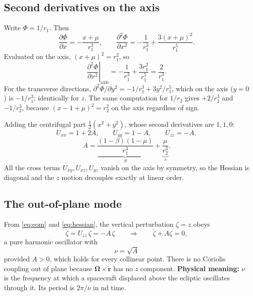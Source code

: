 \documentclass[11pt,a4paper]{article}
\begin{document}
\subsection{Second derivatives on the axis}

Write $\Phi=1/r_1$. Then
\begin{equation}
  \frac{\partial\Phi}{\partial x} = -\frac{x+\mu}{r_1^3},
  \qquad
  \frac{\partial^2\Phi}{\partial x^2}
  = -\frac{1}{r_1^3} + \frac{3(x+\mu)^2}{r_1^5} .
\end{equation}
Evaluated on the axis, $(x+\mu)^2=r_1^2$, so
\begin{equation}
  \left.\frac{\partial^2\Phi}{\partial x^2}\right|_{\mathrm{axis}}
  = -\frac{1}{r_1^3} + \frac{3r_1^2}{r_1^5} = \frac{2}{r_1^3} .
\end{equation}
For the transverse directions, $\partial^2\Phi/\partial y^2
= -1/r_1^3 + 3y^2/r_1^5$, which on the axis ($y=0$) is $-1/r_1^3$; identically
for $z$. The same computation for $1/r_2$ gives $+2/r_2^3$ and $-1/r_2^3$,
because $(x-1+\mu)^2=r_2^2$ on the axis regardless of sign.

Adding the centrifugal part $\tfrac12(x^2+y^2)$, whose second derivatives are
$1,1,0$:
\begin{equation}
  U_{xx} = 1 + 2A, \qquad U_{yy} = 1 - A, \qquad U_{zz} = -A,
  \label{eq:hessian}
\end{equation}
\begin{equation}
  A = \underbrace{\frac{(1-\beta)(1-\mu)}{r_1^3}}_{\textstyle S}
    + \underbrace{\frac{\mu}{r_2^3}}_{\textstyle s} .
  \label{eq:Asplit}
\end{equation}
All the cross terms $U_{xy},U_{xz},U_{yz}$ vanish on the axis by symmetry, so
the Hessian is diagonal and the $z$ motion decouples exactly at linear order.

\subsection{The out-of-plane mode}

From \eqref{eq:eom} and \eqref{eq:hessian}, the vertical perturbation
$\zeta=z$ obeys
\begin{equation}
  \ddot\zeta = U_{zz}\,\zeta = -A\,\zeta
  \qquad\Longrightarrow\qquad
  \ddot\zeta + A\zeta = 0 ,
\end{equation}
a pure harmonic oscillator with
\begin{equation}
  \boxed{\;\nu = \sqrt{A}\;}
  \label{eq:nu}
\end{equation}
provided $A>0$, which holds for every collinear point. There is no Coriolis
coupling out of plane because $\bm\Omega\times\dot{\bm r}$ has no $z$
component. \textbf{Physical meaning:} $\nu$ is the frequency at which a
spacecraft displaced above the ecliptic oscillates through it. Its period is
$2\pi/\nu$ in nd time.
\end{document}
